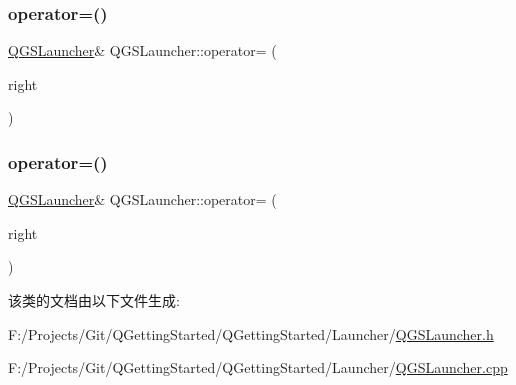 \mbox{\label{class_q_g_s_launcher_a09573b3f4dea862cf1e4811010230678}} 
\subsubsection{\texorpdfstring{operator=()}{operator=()}\hspace{0.1cm}{\footnotesize\ttfamily [1/2]}}
{\footnotesize\ttfamily \mbox{\hyperlink{class_q_g_s_launcher}{Q\+G\+S\+Launcher}}\& Q\+G\+S\+Launcher\+::operator= (\begin{DoxyParamCaption}\item[{const \mbox{\hyperlink{class_q_g_s_launcher}{Q\+G\+S\+Launcher}} \&}]{right }\end{DoxyParamCaption})\hspace{0.3cm}{\ttfamily [delete]}}

\mbox{\label{class_q_g_s_launcher_a83956014aa10c8de76706ca14ba4466d}} 
\subsubsection{\texorpdfstring{operator=()}{operator=()}\hspace{0.1cm}{\footnotesize\ttfamily [2/2]}}
{\footnotesize\ttfamily \mbox{\hyperlink{class_q_g_s_launcher}{Q\+G\+S\+Launcher}}\& Q\+G\+S\+Launcher\+::operator= (\begin{DoxyParamCaption}\item[{\mbox{\hyperlink{class_q_g_s_launcher}{Q\+G\+S\+Launcher}} \&\&}]{right }\end{DoxyParamCaption})\hspace{0.3cm}{\ttfamily [delete]}}



该类的文档由以下文件生成\+:\begin{DoxyCompactItemize}
\item 
F\+:/\+Projects/\+Git/\+Q\+Getting\+Started/\+Q\+Getting\+Started/\+Launcher/\mbox{\hyperlink{_q_g_s_launcher_8h}{Q\+G\+S\+Launcher.\+h}}\item 
F\+:/\+Projects/\+Git/\+Q\+Getting\+Started/\+Q\+Getting\+Started/\+Launcher/\mbox{\hyperlink{_q_g_s_launcher_8cpp}{Q\+G\+S\+Launcher.\+cpp}}\end{DoxyCompactItemize}
